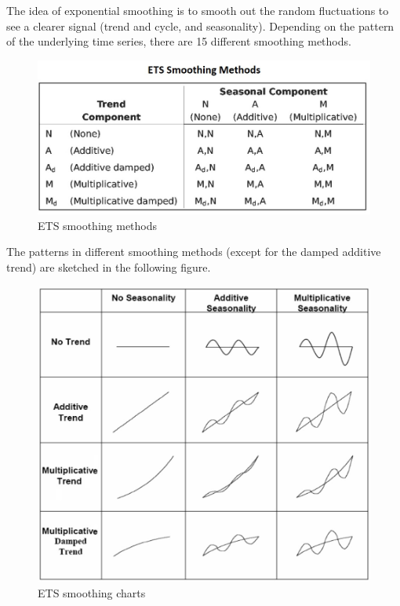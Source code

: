 \documentclass[
]{book}
\begin{document}
The idea of exponential smoothing is to smooth out the random fluctuations to see a clearer signal (trend and cycle, and seasonality). Depending on the pattern of the underlying time series, there are 15 different smoothing methods.

\begin{figure}

{\centering \includegraphics[width=0.8\linewidth]{img13/w13-SmoothingMethodsChart} 

}

\caption{ETS smoothing methods}\label{fig:unnamed-chunk-223}
\end{figure}

The patterns in different smoothing methods (except for the damped additive trend) are sketched in the following figure.

\begin{figure}

{\centering \includegraphics[width=0.8\linewidth]{img13/w13-ETS-CommonSmoothingMethods} 

}

\caption{ETS smoothing charts}\label{fig:unnamed-chunk-224}
\end{figure}
\end{document}
